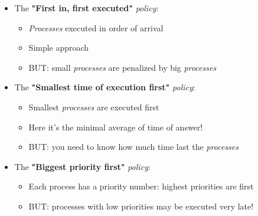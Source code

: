 \documentclass{beamer}[10pt, usepdftitle=false, handout]
\begin{document}
	\begin{frame}
	
	\begin{itemize}
	\item{The \textbf{"First in, first executed"} \textit{policy}:
		\begin{itemize}
		\item{\textit{Processes} executed in order of arrival}
		\item{Simple approach}
		\item{BUT: small \textit{processes} are penalized by big \textit{processes}}
		\end{itemize}
	}
	\vspace*{1em}
	\item{The \textbf{"Smallest time of execution first"} \textit{policy}:
		\begin{itemize}
		\item{Smallest \textit{processes} are executed first}
		\item{Here it's the minimal average of time of answer!}
		\item{BUT: you need to know how much time last the \textit{processes}}
		\end{itemize}	
	}
	\vspace*{1em}
	\item{The \textbf{"Biggest priority first"} \textit{policy}:
	\begin{itemize}
	\item{Each process has a priority number: highest priorities are first}
	\item{BUT: processes with low priorities may be executed very late!}
	\end{itemize}
	
	
	
	}
	\end{itemize}		
	
	
	\end{frame}			
		
\end{document}
